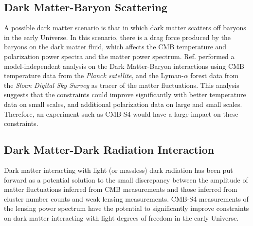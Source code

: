 \subsection{Dark Matter-Baryon Scattering}

A possible dark matter scenario is that in which dark matter scatters off baryons in the early Universe. 
In this scenario, there is a drag force produced by the baryons on the dark matter fluid, which affects the CMB temperature and polarization power spectra and the matter power spectrum.
Ref. \cite{Dvorkin:2013cea} performed a model-independent analysis on the Dark Matter-Baryon interactions using CMB temperature data from the {\it Planck satellite}, and the Lyman-$\alpha$ forest data from the {\it Sloan Digital Sky Survey} as tracer of the matter fluctuations. This analysis suggests that the constraints could improve significantly with better temperature data on small scales, and additional polarization data on large and small scales. Therefore, an experiment such as CMB-S4 would have a large impact on these constraints.

\subsection{Dark Matter-Dark Radiation Interaction}
Dark matter interacting with light (or massless) dark radiation  has been put forward \cite{Buen-Abad:2015ova,Lesgourgues:2015wza} as a potential solution to the small discrepancy between the amplitude of matter fluctuations inferred from CMB measurements and those inferred from cluster number counts and weak lensing measurements. CMB-S4 measurements of the lensing power spectrum have the potential to significantly improve constraints on dark matter interacting with light degrees of freedom in the early Universe.

